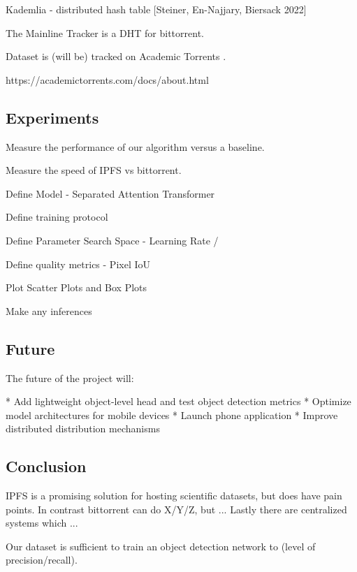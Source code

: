 \documentclass[10pt,twocolumn,letterpaper]{article}
\begin{document}
Kademlia - distributed hash table [Steiner, En-Najjary, Biersack 2022]

The Mainline Tracker is a DHT for bittorrent.



Dataset is (will be) tracked on Academic Torrents \cite{academic_torrents_Cohen2014}.

https://academictorrents.com/docs/about.html


\subsection{Experiments}

Measure the performance of our algorithm versus a baseline.

Measure the speed of IPFS vs bittorrent.

Define Model - Separated Attention Transformer

Define training protocol

Define Parameter Search Space - Learning Rate / 

Define quality metrics - Pixel IoU

Plot Scatter Plots and Box Plots

Make any inferences


\subsection{Future}

The future of the project will:

* Add lightweight object-level head and test object detection metrics
* Optimize model architectures for mobile devices
* Launch phone application
* Improve distributed distribution mechanisms

\subsection{Conclusion}

IPFS is a promising solution for hosting scientific datasets, but does have pain points.
In contrast bittorrent can do X/Y/Z, but ...
Lastly there are centralized systems which ...

Our dataset is sufficient to train an object detection network to (level of
precision/recall).



{\small


}
\end{document}
